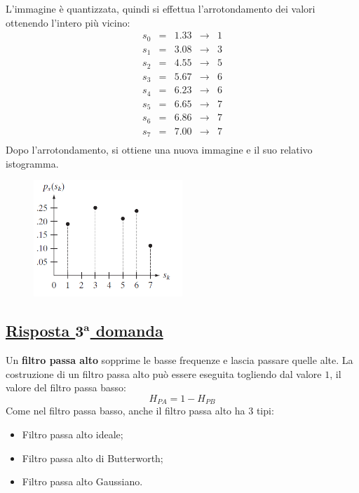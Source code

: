 \documentclass[a4paper]{article}
\begin{document}
	\noindent
	L'immagine è quantizzata, quindi si effettua l'arrotondamento dei valori ottenendo l'intero più vicino:
	\begin{equation*}
		\begin{array}{lllll}
			s_{0} & = & 1.33 & \longrightarrow & 1 \\
			s_{1} & = & 3.08 & \longrightarrow & 3 \\
			s_{2} & = & 4.55 & \longrightarrow & 5 \\
			s_{3} & = & 5.67 & \longrightarrow & 6 \\
			s_{4} & = & 6.23 & \longrightarrow & 6 \\
			s_{5} & = & 6.65 & \longrightarrow & 7 \\
			s_{6} & = & 6.86 & \longrightarrow & 7 \\
			s_{7} & = & 7.00 & \longrightarrow & 7 \\
		\end{array}
	\end{equation*}
	Dopo l'arrotondamento, si ottiene una nuova immagine e il suo relativo istogramma.
	
	\begin{figure}[!htp]
		\centering
		\includegraphics[width=0.5\textwidth]{img/eg_equalizzazione2.png}
	\end{figure}
	
	\subsection*{\textcolor{Green4}{\underline{Risposta $\boldsymbol{3^{a}}$ domanda}}}
	
	\noindent
	Un \textbf{filtro passa alto} sopprime le basse frequenze e lascia passare quelle alte. La costruzione di un filtro passa alto può essere eseguita togliendo dal valore $1$, il valore del filtro passa basso:
	\begin{equation*}
		H_{PA} = 1 - H_{PB}
	\end{equation*}
	Come nel filtro passa basso, anche il filtro passa alto ha 3 tipi:
	\begin{itemize}
		\item Filtro passa alto ideale;
		\item Filtro passa alto di Butterworth;
		\item Filtro passa alto Gaussiano.
	\end{itemize}
\end{document}
